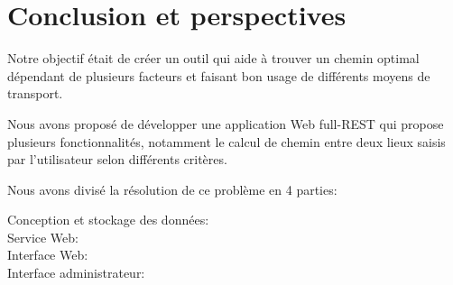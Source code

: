 \chapter{Conclusion et perspectives}

Notre objectif était de créer un outil qui aide à trouver un chemin optimal dépendant de plusieurs facteurs et faisant bon usage de différents moyens de transport. 

Nous avons proposé  de développer une application Web full-REST qui propose plusieurs fonctionnalités, notamment le calcul de chemin entre deux lieux saisis par l'utilisateur selon différents critères.


Nous avons divisé la résolution de ce problème en 4 parties:

\begin{description}
\item[Conception et stockage des données:] 
\item[Service Web:]
\item[Interface Web:]
\item[Interface administrateur:]
\end{description}


